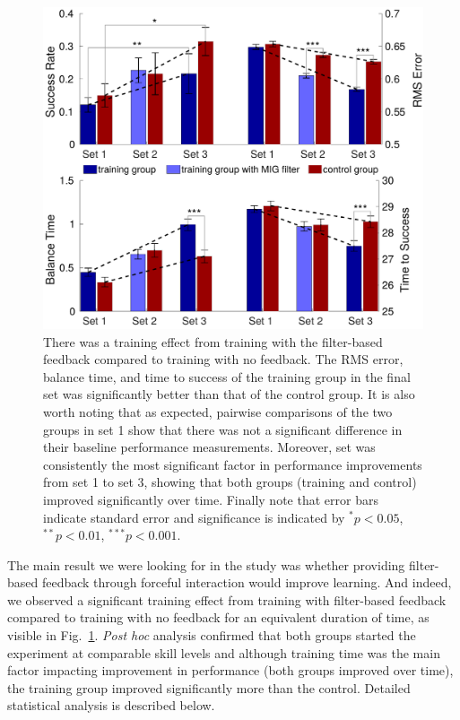 \begin{figure}[!h]
	\begin{center}
		\includegraphics[width=\columnwidth]{training.pdf}
	\end{center}
	\caption{There was a training effect from training with the filter-based feedback compared to training with no feedback. The RMS error, balance time, and time to success of the training group in the final set was significantly better than that of the control group. It is also worth noting that as expected, pairwise comparisons of the two groups in set 1 show that there was not a significant difference in their baseline performance measurements. Moreover, set was consistently the most significant factor in performance improvements from set 1 to set 3, showing that both groups (training and control) improved significantly over time. Finally note that error bars indicate standard error and significance is indicated by $^*p<0.05$, $^{**}p<0.01$, $^{***}p<0.001$.}
	\label{fig: training}
\end{figure}

The main result we were looking for in the study was whether providing filter-based feedback through forceful interaction would improve learning. And indeed, we observed a significant training effect from training with filter-based feedback compared to training with no feedback for an equivalent duration of time, as visible in Fig.~\ref{fig: training}. \textit{Post hoc} analysis confirmed that both groups started the experiment at comparable skill levels and although training time was the main factor impacting improvement in performance (both groups improved over time), the training group improved significantly more than the control. Detailed statistical analysis is described below. 

